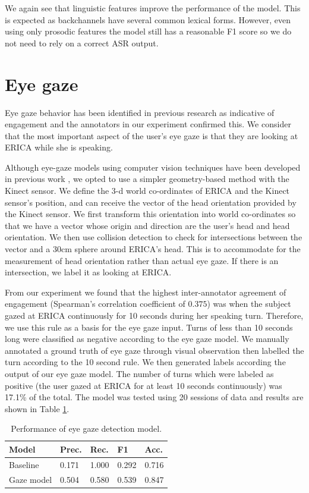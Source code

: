 \documentclass[letterpaper]{article} %
\begin{document}
We again see that linguistic features improve the performance of the model. This is expected as backchannels have several common lexical forms. However, even using only prosodic features the model still has a reasonable F1 score so we do not need to rely on a correct ASR output.

\section{Eye gaze}
Eye gaze behavior has been identified in previous research as indicative of engagement \cite{Nakano2010,Rich2010} and the annotators in our experiment confirmed this. We consider that the most important aspect of the user's eye gaze is that they are looking at ERICA while she is speaking.

Although eye-gaze models using computer vision techniques have been developed in previous work \cite{Sewell2010,Zhang2015}, we opted to use a simpler geometry-based method with the Kinect sensor. We define the 3-d world co-ordinates of ERICA and the Kinect sensor's position, and can receive the vector of the head orientation provided by the Kinect sensor. We first transform this orientation into world co-ordinates so that we have a vector whose origin and direction are the user's head and head orientation. We then use collision detection to check for intersections between the vector and a 30cm sphere around ERICA's head. This is to accommodate for the measurement of head orientation rather than actual eye gaze. If there is an intersection, we label it as looking at ERICA.

From our experiment we found that the highest inter-annotator agreement of engagement (Spearman's correlation coefficient of $0.375$) was when the subject gazed at ERICA continuously for 10 seconds during her speaking turn. Therefore, we use this rule as a basis for the eye gaze input. Turns of less than 10 seconds long were classified as negative according to the eye gaze model. We manually annotated a ground truth of eye gaze through visual observation then labelled the turn according to the 10 second rule. We then generated labels according the output of our eye gaze model. The number of turns which were labeled as positive (the user gazed at ERICA for at least 10 seconds continuously) was 17.1\% of the total. The model was tested using 20 sessions of data and results are shown in Table \ref{gazeresults}.

\begin{table}[h]
\begin{center}
\begin{tabular}{|l|l|l|l|l|}
\hline \bf Model & \bf Prec. & \bf Rec. & \bf F1 & \bf Acc. \\ \hline
Baseline & 0.171 & 1.000 & 0.292 & 0.716 \\
Gaze model & 0.504 & 0.580 & 0.539 & 0.847 \\
\hline
\end{tabular}
\end{center}
\caption{\label{gazeresults} Performance of eye gaze detection model.}
\end{table}
\end{document}
